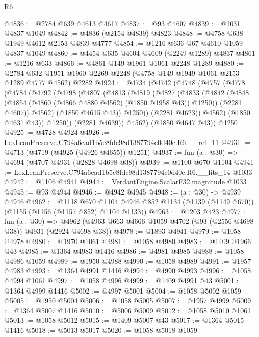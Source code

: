 \begin{lexlean}{R6}
\begin{coremodule}
@4836 := @2784 @639 @4613 @4617
@4837 := @93 @4607
@4839 := @1031 @4837 @1049
@4842 := @4836 (@2154 @4839) @4823
@4848 := @4758 @638 @1949 @4612 @2153 @4839 @4777
@4854 := @1216 @636 @67 @4610 @1059 @4837 @1049
@4860 := @4454 @635 @4604 @4609 (@2249 @1289) @4837
@4861 := @1216 @633
@4866 := @4861 @149 @1961 @1061 @2248 @1289
@4880 := @2784 @632 @1951 @1960 @2269 @2248 (@4758 @149 @1949 @1061 @2153 @1289 @4777 @4562) @2282
@4924 := @4734
    (@4742
      (@4748
        (@4757
          (@4778
            (@4784
              (@4792
                (@4798
                  (@4807
                    (@4813
                      (@4819
                        (@4827
                          (@4833
                            (@4842
                              (@4848 (@4854 (@4860 (@4866 @4880 @4562) (@1850 @1958 @43)) @1250))
                              (@2281 @4607))
                            @4562)
                          (@1850 @4615 @43))
                        @1250))
                    (@2281 @4623))
                  @4562)
                (@1850 @4631 @43))
              @1250))
          (@2281 @4639))
        @4562)
      (@1850 @4647 @43))
    @1250
@4925 := @4728 @4924
@4926 := LexLeanPreserve.C794a6cad1b5e8fdc98d1387794c0d40c.R6.__rel_11
@4931 := @4713 (@4719 (@4925 (@4926 @4655)) @1251)
@4937 := fun (a : @30) => @4694 (@4707 @4931 (@2828 @4698 @38))
@4939 := @1100 @670 @1104
@4941 := LexLeanPreserve.C794a6cad1b5e8fdc98d1387794c0d40c.R6.__fits_14 @1033
@4942 := @1106 @4941
@4944 := VerdantEngine.ScalarF32.magnitude @1033
@4945 := @93 @4944
@4946 := @4942 @4945
@4948 := (a : @30) -> @4939 @4946
@4962 := @1118
    @670
    @1104
    @4946
    @852
    @1134
    (@1139 (@1149 @670))
    (@1155 (@1156 (@1157 @852) @1104 @1133))
@4963 := @1203 @423
@4977 := fun (a : @30) =>
  @4962 (@4963 @663 @4666 @1059 @4702 (@93 (@2556 @4698 @38)) @4931 (@2924 @4698 @38))
@4978 := @1893 @4941
@4979 := @1058 @4978
@4980 := @1970 @1061
@4981 := @1058 @4980
@4983 := @1409 @1966 @43
@4985 := @1364 @4983 @1416
@4986 := @4981 @4985
@4988 := @1058 @4986 @1059
@4989 := @1950 @4988
@4990 := @1058 @4989
@4991 := @1957 @4983
@4993 := @1364 @4991 @1416
@4994 := @4990 @4993
@4996 := @1058 @4994 @1061
@4997 := @1058 @4996
@4999 := @1409 @4991 @43
@5001 := @1364 @4999 @1416
@5002 := @4997 @5001
@5004 := @1058 @5002 @1059
@5005 := @1950 @5004
@5006 := @1058 @5005
@5007 := @1957 @4999
@5009 := @1364 @5007 @1416
@5010 := @5006 @5009
@5012 := @1058 @5010 @1061
@5013 := @1058 @5012
@5015 := @1409 @5007 @43
@5017 := @1364 @5015 @1416
@5018 := @5013 @5017
@5020 := @1058 @5018 @1059

\end{coremodule}
\end{lexlean}
